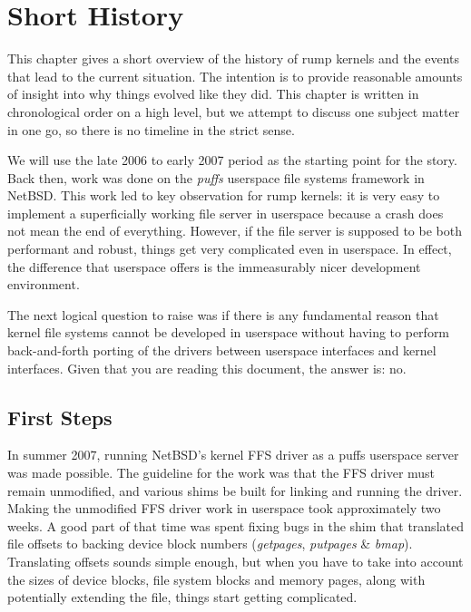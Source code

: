 
\section{Short History}
\label{chap:history}

This chapter gives a short overview of the history of rump kernels and the
events that lead to the current situation.  The intention is to provide
reasonable amounts of insight into why things evolved like they did.
This chapter is written in chronological order on a high level, but we
attempt to discuss one subject matter in one go, so there is no timeline
in the strict sense.

We will use the late 2006 to early 2007 period as the starting point
for the story.  Back then, work was done on the \textit{puffs} userspace
file systems framework in NetBSD.  This work led to key observation for
rump kernels: it is very easy to implement a superficially working file
server in userspace because a crash does not mean the end of everything.
However, if the file server is supposed to be both performant and robust,
things get very complicated even in userspace.  In effect, the difference
that userspace offers is the immeasurably nicer development environment.

The next logical question to raise was if there is any fundamental reason
that kernel file systems cannot be developed in userspace without having
to perform back-and-forth porting of the drivers between userspace
interfaces and kernel interfaces.  Given that you are reading this
document, the answer is: no.


\subsection{First Steps}

In summer 2007, running NetBSD's kernel FFS driver as a puffs userspace
server was made possible.  The guideline for the work was that the FFS
driver must remain unmodified, and various shims be built for linking and
running the driver.  Making the unmodified FFS driver work in userspace
took approximately two weeks.  A good part of that time was spent
fixing bugs in the shim that translated file offsets to backing device
block numbers (\textit{getpages}, \textit{putpages} \& \textit{bmap}).
Translating offsets sounds simple enough, but when you have to take
into account the sizes of device blocks, file system blocks and memory
pages, along with potentially extending the file, things start getting
complicated.

